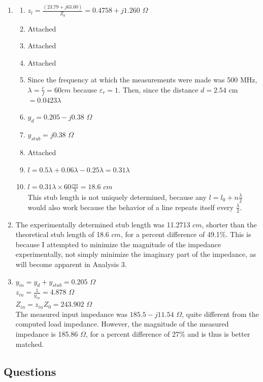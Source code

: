 \documentclass{article}
\begin{document}
\begin{enumerate}
	\item
	\begin{enumerate}
		\item $z_l = \frac{(23.79 + j63.00)}{Z_0} = 0.4758 + j1.260$ $\Omega$
		\item Attached
		\item Attached
		\item Attached
		\item Since the frequency at which the measurements were made was 500 MHz, $\lambda = \frac{c}{f} = 60cm$ because $\varepsilon_r = 1$. Then, since the distance $d = 2.54$ cm $= 0.0423\lambda$
		\item $y_d = 0.205 - j0.38$ $\Omega$
		\item $y_{stub} = j0.38$ $\Omega$
		\item Attached
		\item $l = 0.5\lambda + 0.06\lambda - 0.25\lambda = 0.31\lambda$
		\item $l = 0.31\lambda\times 60\frac{cm}{\lambda} = 18.6$ $cm$ \\
		This stub length is not uniquely determined, because any $l = l_0 + n\frac{\lambda}{2}$ would also work because the behavior of a line repeats itself every $\frac{\lambda}{2}$.
	\end{enumerate}
	\item The experimentally determined stub length was 11.2713 $cm$, shorter than the theoretical stub length of 18.6 $cm$, for a percent difference of 49.1\%. This is because I attempted to minimize the magnitude of the impedance experimentally, not simply minimize the imaginary part of the impedance, as will become apparent in Analysis 3.
	\item $y_{in} = y_d + y_{stub} = 0.205$ $\Omega$ \\
		  $z_{in} = \frac{1}{y_{in}} = 4.878$ $\Omega$ \\
		  $Z_{in} = z_{in}Z_{0} = 243.902$ $\Omega$ \\
		  The measured input impedance was $185.5 - j11.54$ $\Omega$, quite different from the computed load impedance. However, the magnitude of the measured impedance is 185.86 $\Omega$, for a percent difference of 27\% and is thus is better matched.
\end{enumerate}

\subsection{Questions}
\end{document}
